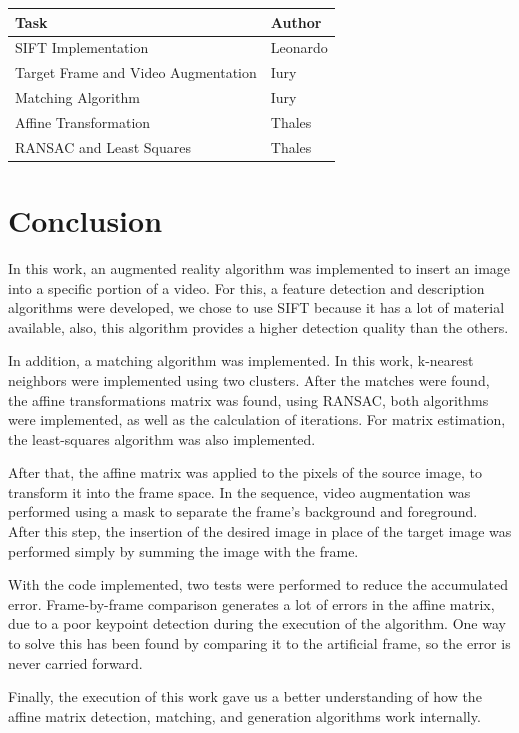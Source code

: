 \documentclass[]{IEEEtran}
\begin{document}
\begin{table}[H]
\begin{tabular}{|l|l|}
\hline
\textbf{Task}                       & \textbf{Author} \\ \hline
SIFT Implementation                 & Leonardo      \\ \hline
Target Frame and Video Augmentation & Iury          \\ \hline
Matching Algorithm                  & Iury          \\ \hline
Affine Transformation               & Thales        \\ \hline
RANSAC and Least Squares            & Thales        \\ \hline
\end{tabular}
\end{table}

\section{Conclusion}

In this work, an augmented reality algorithm was implemented to insert an image into a specific portion of a video. For this, a feature detection and description algorithms were developed, we chose to use SIFT because it has a lot of material available, also, this algorithm provides a higher detection quality than the others.

In addition, a matching algorithm was implemented. In this work, k-nearest neighbors were implemented using two clusters. After the matches were found, the affine transformations matrix was found, using RANSAC, both algorithms were implemented, as well as the calculation of iterations. For matrix estimation, the least-squares algorithm was also implemented.

After that, the affine matrix was applied to the pixels of the source image, to transform it into the frame space. In the sequence, video augmentation was performed using a mask to separate the frame's background and foreground. After this step, the insertion of the desired image in place of the target image was performed simply by summing the image with the frame.

With the code implemented, two tests were performed to reduce the accumulated error. Frame-by-frame comparison generates a lot of errors in the affine matrix, due to a poor keypoint detection during the execution of the algorithm. One way to solve this has been found by comparing it to the artificial frame, so the error is never carried forward.

Finally, the execution of this work gave us a better understanding of how the affine matrix detection, matching, and generation algorithms work internally.
\end{document}
